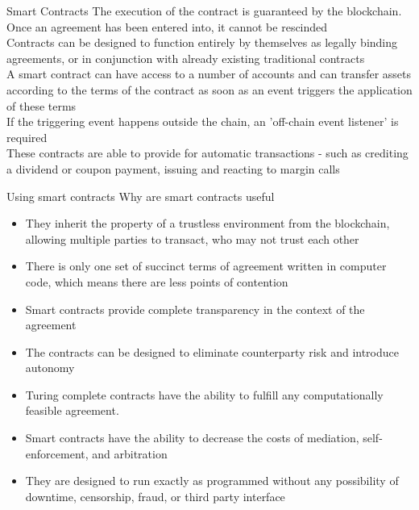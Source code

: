 \documentclass[10pt]{beamer}
\begin{document}
\begin{frame}{Smart Contracts}
	The execution of the contract is guaranteed by the blockchain. Once an agreement has been entered into, it cannot be rescinded \\ \vspace{2mm}
	Contracts can be designed to function entirely by themselves as legally binding agreements, or in conjunction with already existing traditional contracts \\ \vspace{2mm}
	A smart contract can have access to a number of accounts and can transfer assets according to the terms of the contract as soon as an event triggers the application of these terms \\ \vspace{2mm}
	If the triggering event happens outside the chain, an 'off-chain event listener' is required \\ \vspace{2mm}
	These contracts are able to provide for automatic transactions - such as crediting a dividend or coupon payment, issuing and reacting to margin calls
\end{frame}


\begin{frame}{Using smart contracts}
	Why are smart contracts useful
	\begin{itemize}
		\item They inherit the property of a trustless environment from the blockchain, allowing multiple parties to transact, who may not trust each other
		\item There is only one set of succinct terms of agreement written in computer code, which means there are less points of contention
		\item Smart contracts provide complete transparency in the context of the agreement
		\item The contracts can be designed to eliminate counterparty risk and introduce autonomy
		\item Turing complete contracts have the ability to fulfill any computationally feasible agreement.
		\item Smart contracts have the ability to decrease the costs of mediation, self-enforcement, and arbitration
		\item They are designed to run exactly as programmed without any possibility of downtime, censorship, fraud, or third party interface
	\end{itemize}
\end{frame}
\end{document}
